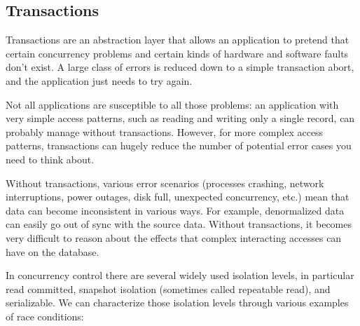\documentclass{article}
\begin{document}
    \subsection{Transactions}
    Transactions are an abstraction layer that allows an application to pretend that certain concurrency problems and certain kinds of hardware and software faults don’t exist. A large class of errors is reduced down to a simple transaction abort, and the application just needs to try again.
    
    Not all applications are susceptible to all those problems: an application with very simple access patterns, such as reading and writing only a single record, can probably manage without transactions. However, for more complex access patterns, transactions can hugely reduce the number of potential error cases you need to think about.
    
    Without transactions, various error scenarios (processes crashing, network interruptions, power outages, disk full, unexpected concurrency, etc.) mean that data can become inconsistent in various ways. For example, denormalized data can easily go out of sync with the source data. Without transactions, it becomes very difficult to reason about the effects that complex interacting accesses can have on the database.
    
    In concurrency control there are several widely used isolation levels, in particular read committed, snapshot isolation (sometimes called repeatable read), and serializable. We can characterize those isolation levels through various examples of race conditions:
    
\end{document}
